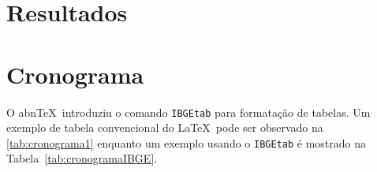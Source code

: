 \documentclass[
	12pt,				    %
	openright,			    %
	oneside,			    %
	a4paper,			    %
    sumario=tradicional,        %
	english,			    %
	brazil,				    %
 ]{abntex2}
\begin{document}

\chapter{Resultados}\label{sec:resultados}

\chapter{Cronograma}\label{sec:cronograma}
O abn\TeX\ introduziu o comando \texttt{IBGEtab} para formatação de tabelas. Um exemplo de tabela convencional do \LaTeX\ pode ser observado na \autoref{tab:cronograma1} enquanto um exemplo usando o \texttt{IBGEtab} é mostrado na Tabela~\ref{tab:cronogramaIBGE}.
\end{document}
